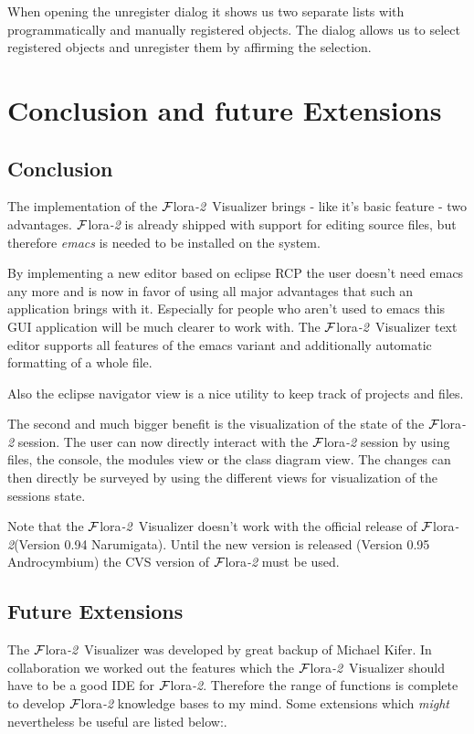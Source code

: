 \documentclass[a4paper,11pt]{article}
\newcommand{\FLORA}{{\mbox{\sc ${\cal F}${lora}\rm\emph{-2}}}\xspace}
\newcommand{\FVIZ}{{\mbox{\sc ${\cal F}${lora}\rm\emph{-2} {Visualizer}}}\xspace}
\begin{document}
When opening the unregister dialog it shows us two separate lists
with programmatically and manually registered objects. The dialog
allows us to select registered objects and unregister them by
affirming the selection.

\section{Conclusion and future Extensions}
\subsection{Conclusion}
The implementation of the \FVIZ brings - like it's basic feature - two
advantages. \FLORA is already shipped with support for editing source
files, but therefore \emph{emacs} is needed to be installed on the system.

By implementing a new editor based on eclipse RCP the user doesn't need
emacs any more and is now in favor of using all major advantages that
such an application brings with it. Especially for people who aren't
used to emacs this GUI application will be much clearer to work with.
The \FVIZ text editor supports all features of the emacs variant and
additionally automatic formatting of a whole file.

Also the eclipse navigator view is a nice utility to keep track of
projects and files.

The second and much bigger benefit is the visualization of the state of
the \FLORA session. The user can now directly interact with the \FLORA
session by using files, the console, the modules view or the class
diagram view. The changes can then directly be surveyed by using
the different views for visualization of the sessions state.

Note that the \FVIZ doesn't work with the official release of
\FLORA (Version 0.94 Narumigata). Until the new version is released
(Version 0.95 Androcymbium) the CVS version of \FLORA must be
used.

\subsection{Future Extensions}
The \FVIZ was developed by great backup of Michael Kifer. In
collaboration we worked out the features which the \FVIZ should
have to be a good IDE for \FLORA. Therefore the range of functions
is complete to develop \FLORA knowledge bases to my mind.
Some extensions which \emph{might} nevertheless be useful are listed below:.
\end{document}

